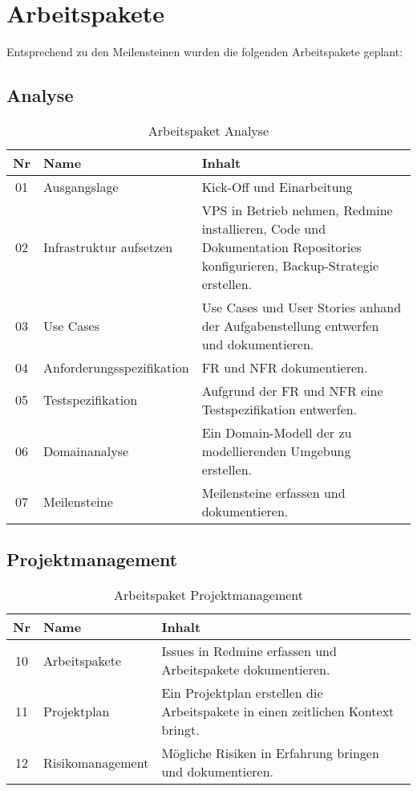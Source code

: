 \section{Arbeitspakete}
\label{sec:Arbeitspakete}

Entsprechend zu den Meilensteinen wurden die folgenden Arbeitspakete geplant:

\subsection{Analyse}
\begin{table}[H]
\begin{tabularx}{\textwidth}{ c | l | X }
\textbf{Nr} & \textbf{Name} & \textbf{Inhalt} \\ \hline
01 & Ausgangslage & Kick-Off und Einarbeitung \\ \hline
02 & Infrastruktur aufsetzen & VPS in Betrieb nehmen, Redmine installieren, Code und Dokumentation Repositories konfigurieren, Backup-Strategie erstellen. \\ \hline
03 & Use Cases & Use Cases und User Stories anhand der Aufgabenstellung entwerfen und dokumentieren.\\ \hline
04 & Anforderungsspezifikation & \ac{FR} und \ac{NFR} dokumentieren.\\ \hline
05 & Testspezifikation & Aufgrund der \ac{FR} und \ac{NFR} eine Testspezifikation entwerfen.\\ \hline
06 & Domainanalyse & Ein Domain-Modell der zu modellierenden Umgebung erstellen.\\ \hline
07 & Meilensteine & Meilensteine erfassen und dokumentieren.\\
\end{tabularx}
\caption{Arbeitspaket Analyse}
\end{table}

\subsection{Projektmanagement}
\begin{table}[H]
\begin{tabularx}{\textwidth}{ c | l | X }
\textbf{Nr} & \textbf{Name} & \textbf{Inhalt} \\ \hline
10 & Arbeitspakete & Issues in Redmine erfassen und Arbeitspakete dokumentieren. \\ \hline
11 & Projektplan & Ein Projektplan erstellen die Arbeitspakete in einen zeitlichen Kontext bringt.\\ \hline
12 & Risikomanagement & Mögliche Risiken in Erfahrung bringen und dokumentieren.\\
\end{tabularx}
\caption{Arbeitspaket Projektmanagement}
\end{table}

